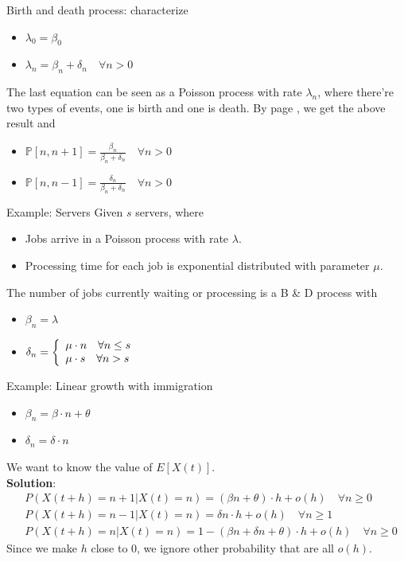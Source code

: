 \documentclass[mathserif]{beamer}
\begin{document}
\begin{frame}{Birth and death process: characterize}
\begin{itemize}
\item $\lambda_0 = \beta_0$
\item $\lambda_n = \beta_n + \delta_n \quad\forall n > 0$
\end{itemize}
The last equation can be seen as a Poisson process with rate $\lambda_n$, where there're two types of events, one is birth and one is death.
By page \pageref{property_1}, we get the above result and
\begin{itemize}
\item $\mathbb{P}[n,n+1] = \frac{\beta_n}{\beta_n + \delta_n} \quad\forall n > 0$
\item $\mathbb{P}[n,n-1] = \frac{\delta_n}{\beta_n + \delta_n} \quad\forall n > 0$
\end{itemize}
\end{frame}

\begin{frame}{Example: Servers}
Given $s$ servers, where
\begin{itemize}
\item Jobs arrive in a Poisson process with rate $\lambda$.
\item Processing time for each job is exponential distributed with parameter $\mu$.
\end{itemize}
The number of jobs currently waiting or processing is a B \& D process with
\begin{itemize}
\item $\beta_n = \lambda$
\item $\displaystyle{\delta_n = \left\{
\begin{array}{l l}
\mu\cdot n \quad\forall n\leq s \\
\mu\cdot s \quad\forall n > s \\
\end{array}
\right.}$
\end{itemize}
\end{frame}

\begin{frame}{Example: Linear growth with immigration}
\begin{itemize}
\item $\beta_n = \beta\cdot n + \theta$
\item $\delta_n = \delta\cdot n$
\end{itemize}
We want to know the value of $E[X(t)]$.\\
\vspace{\baselineskip}
\textbf{Solution}:
\begin{align*}
& P(X(t+h)=n+1|X(t)=n) = (\beta n + \theta)\cdot h + o(h) \quad\forall n\geq 0 \\
& P(X(t+h)=n-1|X(t)=n) = \delta n \cdot h + o(h) \quad\forall n\geq 1 \\
& P(X(t+h)=n|X(t)=n) = 1 - (\beta n + \delta n + \theta)\cdot h + o(h) \quad\forall n\geq 0
\end{align*}
Since we make $h$ close to $0$, we ignore other probability that are all $o(h)$.
\end{frame}
\end{document}

